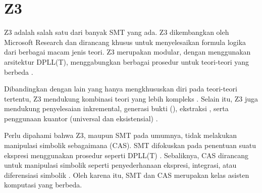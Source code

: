 \section{Z3}

Z3 adalah salah satu dari banyak  SMT yang ada. Z3 dikembangkan oleh Microsoft Research dan dirancang khusus untuk menyelesaikan formula logika dari berbagai macam jenis teori. Z3 merupakan  modular, dengan menggunakan arsitektur DPLL(T), menggabungkan berbagai prosedur untuk teori-teori yang berbeda \citep{demoura2008}.

Dibandingkan dengan  lain yang hanya mengkhususkan diri pada teori-teori tertentu, Z3 mendukung kombinasi teori yang lebih kompleks . Selain itu, Z3 juga mendukung penyelesaian inkremental, generasi bukti (), ekstraksi , serta penggunaan kuantor (universal dan eksistensial) \citep{bjorner}.

Perlu dipahami bahwa Z3, maupun SMT  pada umumnya, tidak melakukan manipulasi simbolik sebagaimana  (CAS). SMT  difokuskan pada penentuan  suatu ekspresi menggunakan prosedur seperti DPLL(T) \citep{demoura2008, bjorner}. Sebaliknya, CAS dirancang untuk manipulasi simbolik seperti penyederhanaan ekspresi, integrasi, atau diferensiasi simbolik \citep{geddes1992}. Oleh karena itu, SMT  dan CAS merupakan kelas asisten komputasi yang berbeda.
